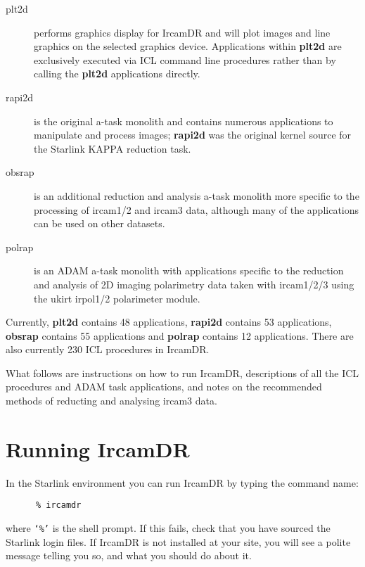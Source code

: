 \begin{description}

\item [plt2d] performs graphics display for {\sc IrcamDR} and will plot
images and line graphics on the selected graphics device.  Applications
within {\bf plt2d} are exclusively executed via ICL command line
procedures rather than by calling the {\bf plt2d} applications directly.

\item [rapi2d] is the original a-task monolith and contains numerous
applications to manipulate and process images; {\bf rapi2d} was the
original kernel source for the Starlink KAPPA reduction task. 

\item [obsrap] is an additional reduction and analysis a-task monolith
more specific to the processing of {\sc ircam1/2} and {\sc ircam3} data,
although many of the applications can be used on other datasets.

\item [polrap] is an {\sc ADAM} a-task monolith with applications specific
to the reduction and analysis of 2D imaging polarimetry data taken with
{\sc ircam1/2/3} using the {\sc ukirt} {\sc irpol1/2} polarimeter module. 

\end{description}

Currently, {\bf plt2d} contains 48 applications, {\bf rapi2d} contains
53 applications, {\bf obsrap} contains 55 applications and {\bf polrap}
contains 12 applications.  There are also currently 230 ICL procedures
in {\sc IrcamDR}.

What follows are instructions on how to run {\sc IrcamDR}, descriptions
of all the ICL procedures and {\sc ADAM} task applications, and notes
on the recommended methods of reducting and analysing {\sc ircam3}
data.

\section{\label{se:running_ircamdr}Running {\sc IrcamDR}}

In the Starlink environment you can run {\sc IrcamDR} by typing the command 
name:

\begin{verbatim}
      % ircamdr 
\end{verbatim}

where {\tt `\%'} is the shell prompt.  If this fails, check that you have
sourced the Starlink login files.  If {\sc IrcamDR} is not installed
at your site, you will see a polite message telling
you so, and what you should do about it.

